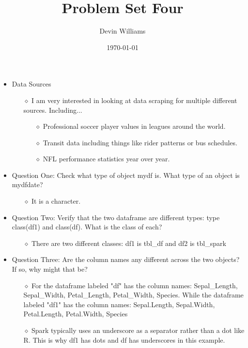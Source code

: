 \documentclass[12pt,letterpaper]{article}
\title{\textbf{Problem Set Four}}
\author{Devin Williams}
\date{\today}
\begin{document}
\maketitle

\begin{itemize}
    \item Data Sources
        \begin{itemize}
            \item[$\diamond$] I am very interested in looking at data scraping for multiple different sources. Including...
                \begin{itemize}
                    \item[$\diamond$] Professional soccer player values in leagues around the world. 
                \end{itemize}
                \begin{itemize}
                    \item[$\diamond$] Transit data including things like rider patterns or bus schedules.
                \end{itemize}
                 \begin{itemize}
                    \item[$\diamond$] NFL performance statistics year over year. 
                \end{itemize}
        \end{itemize}
    \item Question One: Check what type of object mydf is. What type of an object is mydfdate?
       \begin{itemize}
            \item[$\diamond$] It is a character. 
        \end{itemize}
    \item Question Two: Verify that the two dataframe are different types: type class(df1) and class(df). What is the class of each?
        \begin{itemize}
            \item[$\diamond$] There are two different classes: df1 is tbl\_df and df2 is tbl\_spark
        \end{itemize}
    \item Question Three: Are the column names any different across the two objects? If so, why might that be?
        \begin{itemize}
             \item[$\diamond$] For the dataframe labeled "df" has the column names: Sepal\_Length, Sepal\_Width, Petal\_Length, Petal\_Width, Species. While the dataframe labeled "df1" has the column names: Sepal.Length, Sepal.Width, Petal.Length, Petal.Width, Species
        \end{itemize}
        \begin{itemize}
             \item[$\diamond$] Spark typically uses an underscore as a separator rather than a dot like R. This is why df1 has dots and df has underscores in this example. 
        \end{itemize}
        \end{itemize}
\end{document}
